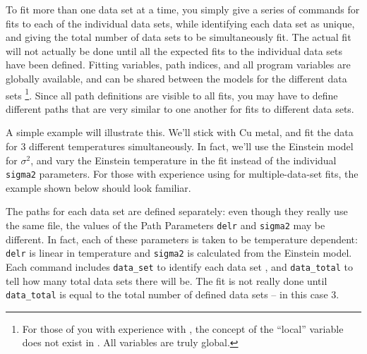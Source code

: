 To fit more than one data set at a time, you simply give a series of
{} commands for fits to each of the individual data sets,
while identifying each data set as unique, and giving the total number of
data sets to be simultaneously fit.  The actual fit will not actually be
done until all the expected fits to the individual data sets have been
defined.  Fitting variables, path indices, and all program variables are
globally available, and can be shared between the models for the different
data sets {\footnote{For those of you with experience with {\feffit}, the
    concept of the ``local'' variable does not exist in {\ifeffit}.  All
    variables are truly global.}}.  Since all path definitions are visible
to all fits, you may have to define different paths that are very similar
to one another for fits to different data sets.

A simple example will illustrate this.  We'll stick with Cu metal, and fit
the data for 3 different temperatures simultaneously.  In fact, we'll use
the Einstein model for $\sigma^2$, and vary the Einstein temperature in the
fit instead of the individual {\tt{sigma2}} parameters.  For those with
experience using {\feffit} for multiple-data-set fits, the example shown
below should look familiar.

The paths for each data set are defined separately: even though they really
use the same {\feffndat} file, the values of the Path Parameters
{\tt{delr}} and {\tt{sigma2}} may be different.  In fact, each of these
parameters is taken to be temperature dependent: {\tt{delr}} is linear in
temperature and {\tt{sigma2}} is calculated from the Einstein model.  Each
{} command includes {\tt{data\_set}} to identify each data set
, and {\tt{data\_total}} to tell how many total data sets there will be.
The fit is not really done until {\tt{data\_total}} is equal to the total
number of defined data sets -- in this case 3. 

